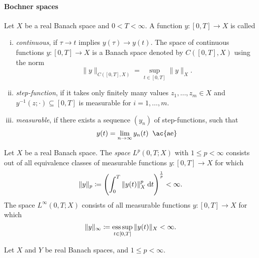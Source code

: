 \documentclass[../skript.tex]{subfiles}
\begin{document}
\paragraph{Bochner spaces}
\addtocounter{dummythm}{2} %
\begin{definition} %
\label{def:c3e9}
Let $X$ be a real Banach space and $0 < T < \infty$. A function $y : [0, T] \to X$ is called
\begin{enumerate}[(i)]
\item \emph{continuous}, if $\tau \to t$ implies $y(\tau) \to y(t)$. The space of continuous functions $y : [0, T] \to X$ is a Banach space denoted by $C([0, T], X)$ using the norm
\[
	\| y \|_{C([0, T], X)} = \sup_{t \in [0, T]} \| y \|_X.
\]
\item \emph{step-function}, if it takes only finitely many values $z_1, \ldots, z_m \in X$ and \\ $y^{-1}(z; \cdot) \subseteq [0, T]$ is measurable for $i = 1, \ldots, m$.
\item \emph{measurable}, if there exists a sequence $(y_n)$ of step-functions, such that
\[
	y(t) = \lim_{n \to \infty} y_n(t) \;\; \text{\ac{ae}}
\]
\end{enumerate}
\end{definition}
\begin{definition} %
\label{def:c3e10}
Let $X$ be a real Banach space. The \emph{space $L^p(0, T; X)$} with $1 \leq p < \infty$ consists out of all equivalence classes of measurable functions $y : [0, T] \to X$ for which
\[
	\| y \|_p \coloneqq \left( \int_0^T \| y(t) \|_X^p \:\mathrm{d}t \right)^{\frac{1}{p}} < \infty.
\]
The space $L^\infty(0, T; X)$ consists of all measurable functions $y : [0, T] \to X$ for which
\[
	\| y \|_{\infty} \coloneqq \operatorname*{ess\,sup}_{t \in [0, T]} \| y(t) \|_X < \infty.
\]
\end{definition}
\begin{proposition} %
\label{thm:c3e11}
Let $X$ and $Y$ be real Banach spaces, and $1 \leq p < \infty$.
\end{proposition}
\end{document}
